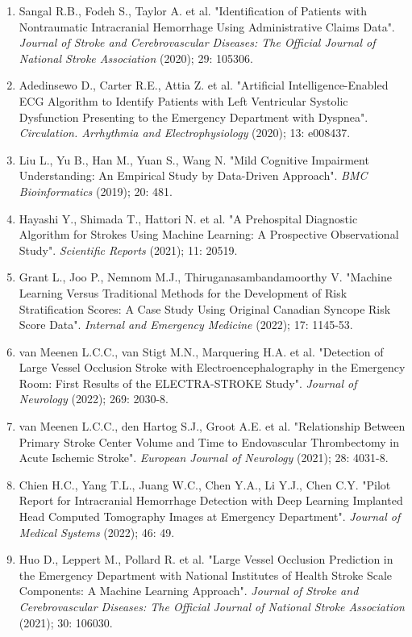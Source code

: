 {{\begin{enumerate}
    \item Sangal R.B., Fodeh S., Taylor A. et al. "Identification of Patients with Nontraumatic Intracranial Hemorrhage Using Administrative Claims Data". \textit{Journal of Stroke and Cerebrovascular Diseases: The Official Journal of National Stroke Association} (2020); 29: 105306.
    \item Adedinsewo D., Carter R.E., Attia Z. et al. "Artificial Intelligence-Enabled ECG Algorithm to Identify Patients with Left Ventricular Systolic Dysfunction Presenting to the Emergency Department with Dyspnea". \textit{Circulation. Arrhythmia and Electrophysiology} (2020); 13: e008437.
    \item Liu L., Yu B., Han M., Yuan S., Wang N. "Mild Cognitive Impairment Understanding: An Empirical Study by Data-Driven Approach". \textit{BMC Bioinformatics} (2019); 20: 481.
    \item Hayashi Y., Shimada T., Hattori N. et al. "A Prehospital Diagnostic Algorithm for Strokes Using Machine Learning: A Prospective Observational Study". \textit{Scientific Reports} (2021); 11: 20519.
    \item Grant L., Joo P., Nemnom M.J., Thiruganasambandamoorthy V. "Machine Learning Versus Traditional Methods for the Development of Risk Stratification Scores: A Case Study Using Original Canadian Syncope Risk Score Data". \textit{Internal and Emergency Medicine} (2022); 17: 1145-53.
    \item van Meenen L.C.C., van Stigt M.N., Marquering H.A. et al. "Detection of Large Vessel Occlusion Stroke with Electroencephalography in the Emergency Room: First Results of the ELECTRA-STROKE Study". \textit{Journal of Neurology} (2022); 269: 2030-8.
    \item van Meenen L.C.C., den Hartog S.J., Groot A.E. et al. "Relationship Between Primary Stroke Center Volume and Time to Endovascular Thrombectomy in Acute Ischemic Stroke". \textit{European Journal of Neurology} (2021); 28: 4031-8.
    \item Chien H.C., Yang T.L., Juang W.C., Chen Y.A., Li Y.J., Chen C.Y. "Pilot Report for Intracranial Hemorrhage Detection with Deep Learning Implanted Head Computed Tomography Images at Emergency Department". \textit{Journal of Medical Systems} (2022); 46: 49.
    \item Huo D., Leppert M., Pollard R. et al. "Large Vessel Occlusion Prediction in the Emergency Department with National Institutes of Health Stroke Scale Components: A Machine Learning Approach". \textit{Journal of Stroke and Cerebrovascular Diseases: The Official Journal of National Stroke Association} (2021); 30: 106030.

\end{enumerate}}}
